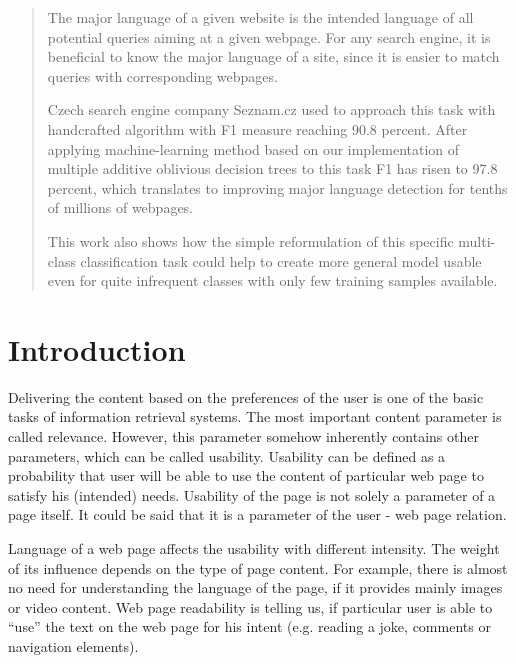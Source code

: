 \documentclass{acm_proc_article-sp}
\begin{document}
\maketitle
\begin{abstract}
The major language of a given website is the intended language of all potential queries aiming at a given webpage.
For any search engine, it is beneficial to know the major language of a site, since it is easier to match
queries with corresponding webpages.

Czech search engine company Seznam.cz used to approach this task with handcrafted algorithm with F1 measure reaching
90.8 percent. After applying machine-learning method based on our implementation of multiple additive oblivious decision trees
to this task F1 has risen to 97.8 percent, which translates to improving major language detection for tenths of millions of webpages.

This work also shows how the simple reformulation of this specific multi-class classification task could help
to create more general model usable even for quite infrequent classes with only few training samples available.


\end{abstract}

\section{Introduction}
  Delivering the content based on the preferences of the user is one of the basic tasks of information retrieval systems.
  The most important content parameter is called relevance. 
  However, this parameter somehow inherently contains other parameters, which can be called usability.
  Usability can be defined as a probability that user will be able to use the content of particular 
  web page to satisfy his (intended) needs.
  Usability of the page is not solely a parameter of a page itself.
  It could be said that it is a parameter of the user - web page relation.

  Language of a web page affects the usability with different intensity. 
  The weight of its influence depends on the type of page content.
  For example, there is almost no need for understanding the language of the page, if it provides mainly images or video content.
  Web page readability is telling us, if particular user is able to
  ``use'' the text on the web page for his intent (e.g. reading a joke, comments or navigation elements).
 
\end{document}
